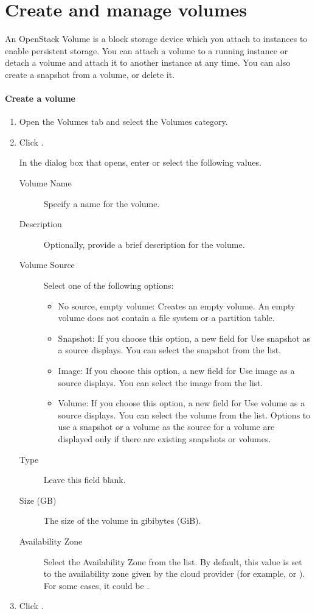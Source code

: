\chapter{Create and manage volumes}
An \gls{OpenStack Volume} is a block storage device which you attach
to instances to enable persistent storage. You can attach a volume to
a running instance or detach a volume and attach it to another
instance at any time. You can also create a snapshot from a volume, or
delete it.

\subsubsection{Create a volume}\label{create-a-volume}
\begin{enumerate}
\item Open the Volumes tab and select the Volumes category.
\item Click .

  In the dialog box that opens, enter or select the following values.

  \begin{description}
  \item[Volume Name] Specify a name for the volume.
  \item[Description] Optionally, provide a brief description for the volume.
  \item[Volume Source] Select one of the following options:

    \begin{itemize}
    \item No source, empty volume: Creates an empty volume. An empty
      volume does not contain a file system or a partition table.
    \item Snapshot: If you choose this option, a new field for Use
      snapshot as a source displays. You can select the snapshot from
      the list.
    \item Image: If you choose this option, a new field for Use image
      as a source displays. You can select the image from the list.
    \item Volume: If you choose this option, a new field for Use
      volume as a source displays. You can select the volume from the
      list. Options to use a snapshot or a volume as the source for a
      volume are displayed only if there are existing snapshots or
      volumes.
    \end{itemize}
  \item[Type] Leave this field blank.
  \item[Size (GB)] The size of the volume in gibibytes (GiB).
  \item[Availability Zone] Select the Availability Zone from the
    list. By default, this value is set to the availability zone given
    by the cloud provider (for example,  or
    ). For some cases, it could be .
  \end{description}
\item Click .
\end{enumerate}

